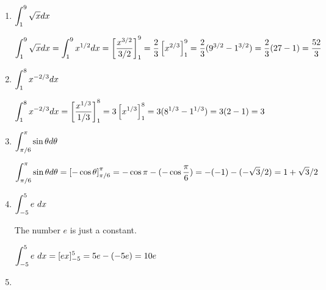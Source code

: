 \begin{enumerate}[1.]
\item \begin{Question}
  $\displaystyle \int_1^9 \sqrt{x} dx$
\end{Question}

\begin{Solution}
  $\displaystyle \int_1^9 \sqrt{x} dx = \int_1^9 x^{1 / 2} dx = 
    \left[ \frac{x^{3 / 2}}{3 / 2} \right]_1^9 =
    \frac{2}{3} \left[ x^{2 / 3} \right]_1^9 =
    \frac{2}{3} (9^{3 / 2} - 1^{3 / 2}) = 
    \frac{2}{3} (27 - 1) = \frac{52}{3}$
\end{Solution}

\item \begin{Question}
    
  $\displaystyle \int_1^8 x^{-2 / 3} dx$
\end{Question}

\begin{Solution}
    
  $\displaystyle \int_1^8 x^{-2 / 3} dx = 
    \left[ \frac{x^{1 / 3}}{1 / 3} \right]_1^8 = 
    3 \left[ x^{1 / 3} \right]_1^8 = 
    3(8^{1 / 3} - 1^{1 / 3}) = 3(2 - 1) = 3$
    
\end{Solution}

\item \begin{Question}
    
  $\displaystyle \int_{\pi / 6}^{\pi} \sin \theta d \theta$
\end{Question}

\begin{Solution}
  $\displaystyle \int_{\pi / 6}^{\pi} \sin \theta d \theta =
    \left[ - \cos \theta \right]_{\pi / 6}^{\pi} =
    - \cos \pi - ( - \cos \frac{\pi}{6} ) = 
    -(-1) - (- \sqrt{3} / 2) = 1 + \sqrt{3} / 2$
\end{Solution}

\item \begin{Question}
    
  $\displaystyle \int_{-5}^5 e~ dx$
\end{Question}

\begin{Solution}
  The number $e$ is just a constant. 

    $\displaystyle \int_{-5}^5 e ~dx = [e x]_{-5}^5 = 5e - (-5e) = 10e$
    
\end{Solution}

\item \begin{Question}
    

\end{Question}
\end{enumerate}
